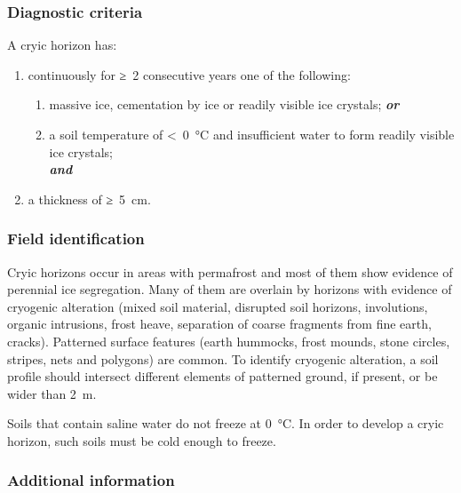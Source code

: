 \documentclass[
  letterpaper,
  DIV=11,
  numbers=noendperiod]{scrreprt}
\providecommand{\tightlist}{%
  \setlength{\itemsep}{0pt}\setlength{\parskip}{0pt}}\usepackage{longtable,booktabs,array}
\begin{document}
\hypertarget{diagnostic-criteria-7}{%
\subsubsection{Diagnostic criteria}\label{diagnostic-criteria-7}}

A cryic horizon has:

\begin{enumerate}
\def\labelenumi{\arabic{enumi}.}
\tightlist
\item
  continuously for ≥~2 consecutive years one of the following:

  \begin{enumerate}
  \def\labelenumii{\alph{enumii}.}
  \tightlist
  \item
    massive ice, cementation by ice or readily visible ice crystals;
    \textbf{\emph{or}}
  \item
    a soil temperature of \textless~0~°C and insufficient water to form
    readily visible ice crystals;\\
    \textbf{\emph{and}}
  \end{enumerate}
\item
  a thickness of ≥~5~cm.
\end{enumerate}

\hypertarget{field-identification-5}{%
\subsubsection{Field identification}\label{field-identification-5}}

Cryic horizons occur in areas with permafrost and most of them show
evidence of perennial ice segregation. Many of them are overlain by
horizons with evidence of cryogenic alteration (mixed soil material,
disrupted soil horizons, involutions, organic intrusions, frost heave,
separation of coarse fragments from fine earth, cracks). Patterned
surface features (earth hummocks, frost mounds, stone circles, stripes,
nets and polygons) are common. To identify cryogenic alteration, a soil
profile should intersect different elements of patterned ground, if
present, or be wider than 2~m.

Soils that contain saline water do not freeze at 0~°C. In order to
develop a cryic horizon, such soils must be cold enough to freeze.

\hypertarget{additional-information-4}{%
\subsubsection{Additional information}\label{additional-information-4}}
\end{document}
